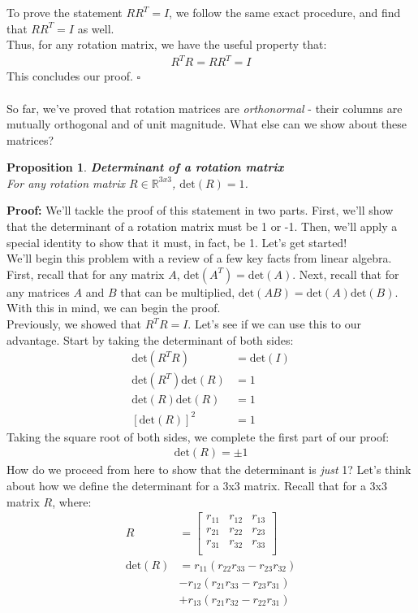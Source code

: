\documentclass[oneside]{book}
\newtheorem{proposition}{Proposition}
\newenvironment{prop} %
  {\colorlet{shadecolor}{blue!9}\begin{shaded}\begin{proposition}}
  {\end{proposition}\end{shaded}}
\begin{document}
To prove the statement $RR^T = I$, we follow the same exact procedure, and find that $RR^T = I$ as well.\\
Thus, for any rotation matrix, we have the useful property that:
\begin{align}
    R^TR = RR^T = I
\end{align}
This concludes our proof. $\square$\\\\
So far, we've proved that rotation matrices are \textit{orthonormal} - their columns are mutually orthogonal and of unit magnitude. What else can we show about these matrices?
\begin{prop}
\textbf{Determinant of a rotation matrix}\\
For any rotation matrix $R \in \mathbb{R}^{3x3}$, $\mathrm{det}(R) = 1$.
\end{prop}\noindent
\textbf{Proof: }We'll tackle the proof of this statement in two parts. First, we'll show that the determinant of a rotation matrix must be 1 or -1. Then, we'll apply a special identity to show that it must, in fact, be 1. Let's get started!\\
We'll begin this problem with a review of a few key facts from linear algebra. First, recall that for any matrix $A$, $\mathrm{det}(A^T) = \mathrm{det}(A)$. Next, recall that for any matrices $A$ and $B$ that can be multiplied, $\mathrm{det}(AB) = \mathrm{det}(A)\mathrm{det}(B)$. With this in mind, we can begin the proof.\\
Previously, we showed that $R^TR = I$. Let's see if we can use this to our advantage. Start by taking the determinant of both sides:
\begin{align}
    \mathrm{det}(R^TR) &= \mathrm{det}(I)\\
    \mathrm{det}(R^T)\mathrm{det}(R) &= 1\\
    \mathrm{det}(R)\mathrm{det}(R) &= 1\\
    [\mathrm{det}(R)]^2 &= 1
\end{align}
Taking the square root of both sides, we complete the first part of our proof:
\begin{align}
    \mathrm{det}(R) = \pm 1
\end{align}
How do we proceed from here to show that the determinant is \textit{just} 1? Let's think about how we define the determinant for a 3x3 matrix. Recall that for a 3x3 matrix $R$, where:
\begin{align}
    R &= \begin{bmatrix}
    r_{11} &  r_{12} & r_{13}\\
    r_{21} &  r_{22} & r_{23}\\
    r_{31} &  r_{32} & r_{33}\\
    \end{bmatrix}\\
    \mathrm{det}(R) &= r_{11}(r_{22}r_{33}- r_{23}r_{32}) \\
    &- r_{12}(r_{21}r_{33}- r_{23}r_{31})\\
    &+ r_{13}(r_{21}r_{32} - r_{22}r_{31}) 
\end{align}
\end{document}

